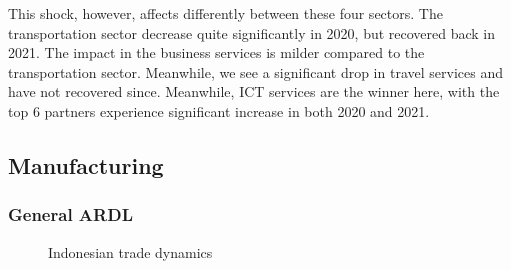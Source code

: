 \documentclass[
  a4paper,
  DIV=11,
  numbers=noendperiod]{scrreprt}
\begin{document}
This shock, however, affects differently between these four sectors. The
transportation sector decrease quite significantly in 2020, but
recovered back in 2021. The impact in the business services is milder
compared to the transportation sector. Meanwhile, we see a significant
drop in travel services and have not recovered since. Meanwhile, ICT
services are the winner here, with the top 6 partners experience
significant increase in both 2020 and 2021.

\subsection{Manufacturing}\label{manufacturing}

\subsubsection{General ARDL}\label{general-ardl}

\begin{figure}


\caption{\label{fig-idn}Indonesian trade dynamics}

\end{figure}%
\end{document}
